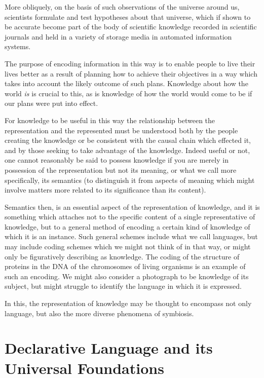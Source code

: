 More obliquely, on the basis of such observations of the universe around us, scientists formulate and test hypotheses about that universe, which if shown to be accurate become part of the body of scientific knowledge recorded in scientific journals and held in a variety of storage media in automated information systems.

The purpose of encoding information in this way is to enable people to live their lives better as a result of planning how to achieve their objectives in a way which takes into account the likely outcome of such plans.
Knowledge about how the world \emph{is} is crucial to this, as is knowledge of how the world would come to be if our plans were put into effect.

For knowledge to be useful in this way the relationship between the representation and the represented must be understood both by the people creating the knowledge or be consistent with the causal chain which effected it, and by those seeking to take advantage of the knowledge.
Indeed useful or not, one cannot reasonably be said to possess knowledge if you are merely in possession of the representation but not its meaning, or what we call more specifically, its semantics (to distinguish it from aspects of meaning which might involve matters more related to its significance than its content).

Semantics then, is an essential aspect of the representation of knowledge, and it is something which attaches not to the specific content of a single representative of knowledge, but to a general method of encoding a certain kind of knowledge of which it is an instance.
Such general schemes include what we call languages, but may include coding schemes which we might not think of in that way, or might only be figuratively describing as knowledge.
The coding of the structure of proteins in the DNA of the chromosomes of living organisms is an example of such an encoding.
We might also consider a photograph to be knowledge of its subject, but might struggle to identify the language in which it is expressed.

In this, the representation of knowledge may be thought to encompass not only language, but also the more diverse phenomena of symbiosis.

\section{Declarative Language and its Universal Foundations}


